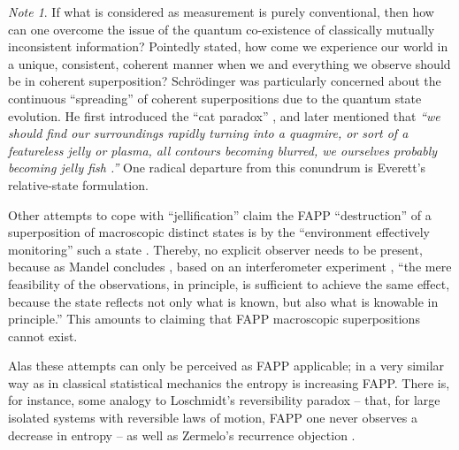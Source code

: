\documentclass[%
  preprint,
 showpacs,
 showkeys,
 preprintnumbers,
 amsmath,amssymb,
 aps,
 prl,
  longbibliography,
 ]{revtex4-1}
\theoremstyle{definition}
\theoremstyle{remark}
\newtheorem*{note}{Note}
\begin{document}
\begin{note}
If what is considered as measurement is purely conventional,
then how can one overcome the issue of the quantum co-existence of classically mutually inconsistent information?
Pointedly stated, how come we experience our world in a unique, consistent,
coherent manner when we and everything we observe should be in  coherent superposition?
Schr\"odinger was particularly concerned about
the continuous ``spreading'' of coherent superpositions due to the quantum state evolution.
He first introduced the ``cat paradox'' \cite{schrodinger}, and later mentioned
that {\em ``we should find our surroundings rapidly
turning into a quagmire, or sort of a featureless jelly or plasma, all contours
becoming blurred, we ourselves probably becoming jelly fish
\cite{schroedinger-interpretation}.''}
One radical departure from this conundrum is Everett's relative-state formulation.

Other attempts to cope with ``jellification'' claim the FAPP ``destruction''
of a superposition of macroscopic distinct states
is by the
``environment effectively monitoring'' such a state \cite{RevModPhys.75.715}.
Thereby, no explicit observer needs to be present, because as
Mandel concludes \cite{mandel-operational-cat},
based on an interferometer experiment \cite{zou-wang-mandel:91a,zou-wang-mandel:91b},
``the mere feasibility of the observations, in principle, is sufficient to achieve the same effect, because
the state reflects not only what is known, but also what is knowable in principle.''
This amounts to claiming that FAPP macroscopic superpositions cannot exist.

Alas these attempts  can only be perceived as FAPP applicable;
in a very similar way as in classical statistical mechanics the entropy is increasing FAPP.
There is, for instance, some analogy to Loschmidt's reversibility paradox \cite[p.~139]{Loschmidt}
--
that, for large isolated systems with reversible laws of motion, FAPP  one never
observes a decrease in entropy
--
as well as Zermelo's recurrence objection  \cite[pp.~18ff]{Ebbinghaus-Zermelo}.
\end{note}
\end{document}
